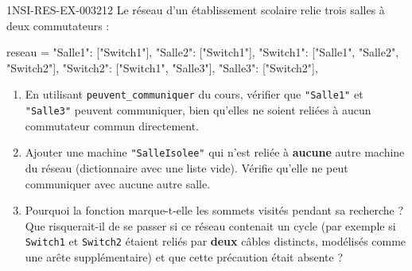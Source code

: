 \begin{exercice}{1NSI-RES-EX-003}{2}{12}
Le réseau d'un établissement scolaire relie trois salles à deux commutateurs :
\begin{python}
reseau = {
    "Salle1": ["Switch1"],
    "Salle2": ["Switch1"],
    "Switch1": ["Salle1", "Salle2", "Switch2"],
    "Switch2": ["Switch1", "Salle3"],
    "Salle3": ["Switch2"],
}
\end{python}
\begin{enumerate}
  \item En utilisant \lstinline{peuvent_communiquer} du cours, vérifier que \lstinline{"Salle1"} et \lstinline{"Salle3"} peuvent communiquer, bien qu'elles ne soient reliées à aucun commutateur commun directement.
  \item Ajouter une machine \lstinline{"SalleIsolee"} qui n'est reliée à \textbf{aucune} autre machine du réseau (dictionnaire avec une liste vide). Vérifie qu'elle ne peut communiquer avec aucune autre salle.
  \item Pourquoi la fonction marque-t-elle les sommets \og visités \fg{} pendant sa recherche ? Que risquerait-il de se passer si ce réseau contenait un cycle (par exemple si \lstinline{Switch1} et \lstinline{Switch2} étaient reliés par \textbf{deux} câbles distincts, modélisés comme une arête supplémentaire) et que cette précaution était absente ?
\end{enumerate}
\end{exercice}
